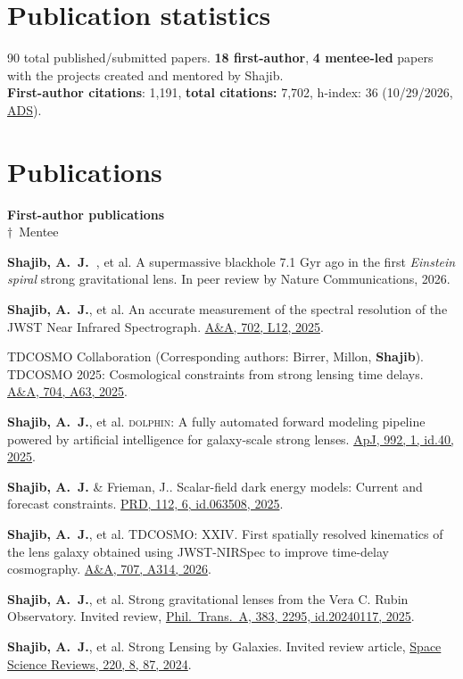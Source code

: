 \documentclass[margin, line]{res}
\newcommand{\pubstat}{
\section{\sc Publication statistics} 90 total published/submitted papers. \textbf{18 first-author}, \textbf{4 mentee-led} papers with the projects created and mentored by {Shajib}. \\ \textbf{First-author citations}: 1,191, \textbf{total citations:} 7,702, h-index: 36 (10/29/2026, \href{https://ui.adsabs.harvard.edu/user/libraries/NYgiA71JS4CR85Tt8CgJsw}{ADS}).
}
\begin{document}
\begin{resume}

\pubstat

\section{\sc Publications}
\textbf{First-author publications}
\newcommand{\mentee}{${\boldsymbol{\dagger}}$}
\\ \mentee\ Mentee
\begin{etaremune}
	\item \textbf{Shajib, A.~J.~}, et al. A supermassive blackhole 7.1 Gyr ago in the first \textit{Einstein spiral} strong gravitational lens. In peer review by Nature Communications, 2026.
	\item \textbf{Shajib, A.~J.}, et al. An accurate measurement of the spectral resolution of the JWST Near Infrared Spectrograph. \href{https://ui.adsabs.harvard.edu/abs/2025A\%26A...702L..12S/abstract}{A\&A, 702, L12, 2025}.
	\item TDCOSMO Collaboration (Corresponding authors: Birrer, Millon, \textbf{Shajib}). TDCOSMO 2025: Cosmological constraints from strong lensing time delays. \href{https://ui.adsabs.harvard.edu/abs/2025A\%26A...704A..63T/abstract}{A\&A, 704, A63, 2025}.
	\item \textbf{Shajib, A.~J.}, et al. \textsc{dolphin}: A fully automated forward modeling pipeline powered by artificial intelligence for galaxy-scale strong lenses. \href{https://ui.adsabs.harvard.edu/abs/2025ApJ...992...40S/abstract}{ApJ, 992, 1, id.40, 2025}.
	\item \textbf{Shajib, A.~J.} \& Frieman, J.. Scalar-field dark energy models: Current and forecast constraints. \href{https://ui.adsabs.harvard.edu/abs/2025PhRvD.112f3508S/abstract}{PRD, 112, 6, id.063508, 2025}.
	\item \textbf{Shajib, A.~J.}, et al. TDCOSMO: XXIV. First spatially resolved kinematics of the lens galaxy obtained using JWST-NIRSpec to improve time-delay cosmography. \href{https://ui.adsabs.harvard.edu/abs/2026A\%26A...707A.314S/abstract}{A\&A, 707, A314, 2026}. 
	\item \textbf{Shajib, A.~J.}, et al. Strong gravitational lenses from the Vera C. Rubin Observatory. Invited review, \href{https://ui.adsabs.harvard.edu/abs/2025RSPTA.38340117S/abstract}{Phil.~Trans.~A, 383, 2295, id.20240117, 2025}.
	\item \textbf{Shajib, A.~J.}, et al. Strong Lensing by Galaxies. Invited review article, \href{https://ui.adsabs.harvard.edu/abs/2024SSRv..220...87S/abstract}{Space Science Reviews, 220, 8, 87, 2024}.

\end{etaremune}
\end{resume}
\end{document}
